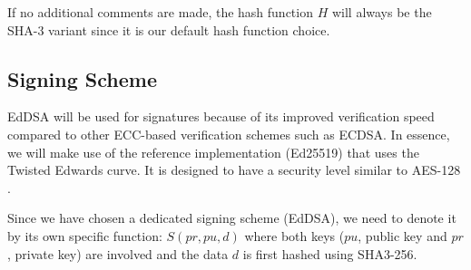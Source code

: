 If no additional comments are made, the hash function $H$ will always be the SHA-3 variant since it is our default hash function choice.

\subsection{Signing Scheme}

EdDSA will be used for signatures because of its improved verification speed compared to other ECC-based verification schemes such as ECDSA. In essence, we will make use of the reference implementation (Ed25519) that uses the Twisted Edwards curve. It is designed to have a security level similar to AES-128 \cite{EdDSA}.

Since we have chosen a dedicated signing scheme (EdDSA), we need to denote it by its own specific function: $S(pr,pu,d)$ where both keys ($pu$, public key and $pr$, private key) are involved and the data $d$ is first hashed using SHA3-256.
